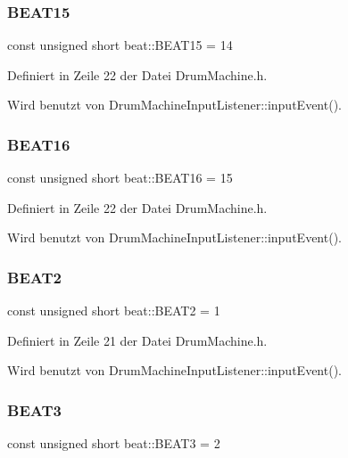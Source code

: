 \subsubsection{\texorpdfstring{B\+E\+A\+T15}{BEAT15}}
{\footnotesize\ttfamily const unsigned short beat\+::\+B\+E\+A\+T15 = 14}



Definiert in Zeile 22 der Datei Drum\+Machine.\+h.



Wird benutzt von Drum\+Machine\+Input\+Listener\+::input\+Event().

\mbox{\label{namespacebeat_ad619f02c1a78c30570d7371411f1ef47}} 
\subsubsection{\texorpdfstring{B\+E\+A\+T16}{BEAT16}}
{\footnotesize\ttfamily const unsigned short beat\+::\+B\+E\+A\+T16 = 15}



Definiert in Zeile 22 der Datei Drum\+Machine.\+h.



Wird benutzt von Drum\+Machine\+Input\+Listener\+::input\+Event().

\mbox{\label{namespacebeat_a219eb8f5f0218df3af3f4d4d9214327f}} 
\subsubsection{\texorpdfstring{B\+E\+A\+T2}{BEAT2}}
{\footnotesize\ttfamily const unsigned short beat\+::\+B\+E\+A\+T2 = 1}



Definiert in Zeile 21 der Datei Drum\+Machine.\+h.



Wird benutzt von Drum\+Machine\+Input\+Listener\+::input\+Event().

\mbox{\label{namespacebeat_a0ccf0d5bdc6dfdae1fd7b1667655a18f}} 
\subsubsection{\texorpdfstring{B\+E\+A\+T3}{BEAT3}}
{\footnotesize\ttfamily const unsigned short beat\+::\+B\+E\+A\+T3 = 2}



